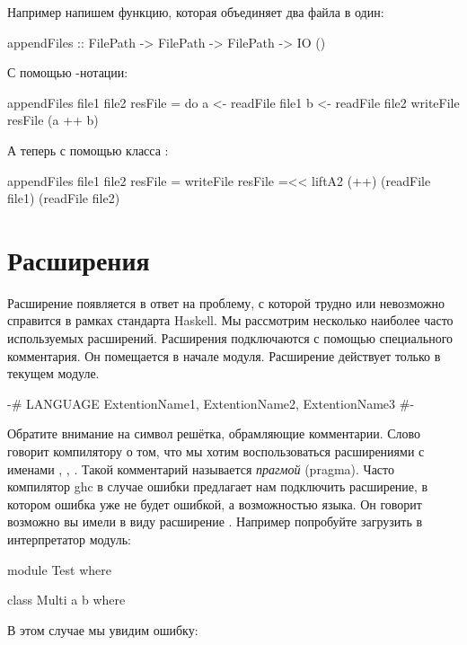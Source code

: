 Например напишем функцию, которая объединяет два файла
в один:

\begin{code}
appendFiles :: FilePath -> FilePath -> FilePath -> IO ()
\end{code}

 С помощью -нотации:

\begin{code}
appendFiles file1 file2 resFile = do
	a <- readFile file1
	b <- readFile file2
	writeFile resFile (a ++ b)	
\end{code}

А теперь с помощью класса :

\begin{code}
appendFiles file1 file2 resFile = writeFile resFile =<< 
	liftA2 (++) (readFile file1) (readFile file2)
\end{code}

\section{Расширения}

Расширение появляется в ответ на проблему, с которой трудно 
или невозможно справится 
в рамках стандарта Haskell. Мы рассмотрим несколько 
наиболее часто используемых расширений. 
Расширения подключаются с помощью специального
комментария. Он помещается в начале модуля. 
Расширение действует только в текущем модуле.

\begin{code}
{-# LANGUAGE  ExtentionName1, ExtentionName2, ExtentionName3 #-}
\end{code}

Обратите внимание на символ решётка, обрамляющие комментарии.
Слово  говорит компилятору о том, что мы хотим
воспользоваться расширениями с именами ,
, .
Такой комментарий называется \emph{прагмой} (pragma).
Часто компилятор ghc в случае ошибки предлагает
нам подключить расширение, в котором ошибка уже не будет
ошибкой, а возможностью языка. Он говорит возможно вы 
имели в виду расширение . Например попробуйте
загрузить в интерпретатор модуль:

\begin{code}
module Test where

class Multi a b where
\end{code}

В этом случае мы увидим ошибку:

